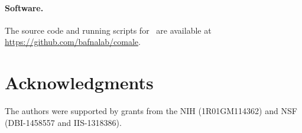 \paragraph{Software.}
The source code and running scripts for \comale\ are available at \\
\href{https://github.com/bafnalab/comale}{https://github.com/bafnalab/comale}.

\section*{Acknowledgments}
The authors were supported by grants from the NIH (1R01GM114362) and
NSF (DBI-1458557 and IIS-1318386).
